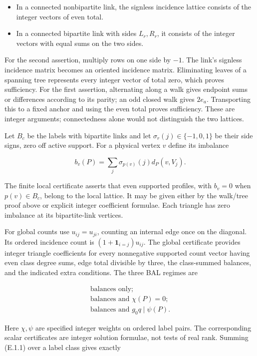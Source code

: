 \documentclass[english,11pt,a4paper]{article}
\providecommand{\tightlist}{\setlength{\itemsep}{0pt}\setlength{\parskip}{0pt}}
\begin{document}
\begin{itemize}
\tightlist
\item
  In a connected nonbipartite link, the signless incidence lattice consists of the integer vectors of even total.
\item
  In a connected bipartite link with sides \(L_r,R_r\), it consists of the integer vectors with equal sums on the two sides.
\end{itemize}

For the second assertion, multiply rows on one side by \(-1\). The link's signless incidence matrix becomes an oriented incidence matrix. Eliminating leaves of a spanning tree represents every integer vector of total zero, which proves sufficiency. For the first assertion, alternating along a walk gives endpoint sums or differences according to its parity; an odd closed walk gives \(2e_a\). Transporting this to a fixed anchor and using the even total proves sufficiency. These are integer arguments; connectedness alone would not distinguish the two lattices.

Let \(B_c\) be the labels with bipartite links and let \(\sigma_r(j)\in\{-1,0,1\}\) be their side signs, zero off active support. For a physical vertex \(v\) define its imbalance

\[b_v(P)=\sum_j\sigma_{p(v)}(j)d_P(v,V_j).
\tag{E.1.1}\]

The finite local certificate asserts that even supported profiles, with \(b_v=0\) when \(p(v)\in B_c\), belong to the local lattice. It may be given either by the walk/tree proof above or explicit integer coefficient formulae. Each triangle has zero imbalance at its bipartite-link vertices.

For global counts use \(u_{ij}=u_{ji}\), counting an internal edge once on the diagonal. Its ordered incidence count is \((1+\mathbf1_{i=j})u_{ij}\). The global certificate provides integer triangle coefficients for every nonnegative supported count vector having even class degree sums, edge total divisible by three, the class-summed balances, and the indicated extra conditions. The three BAL regimes are

\[\begin{gathered}
\text{balances only};\\
\text{balances and }\chi(P)=0;\\
\text{balances and }g_0q\mid\psi(P).
\end{gathered}
\tag{E.1.2}\]

Here \(\chi,\psi\) are specified integer weights on ordered label pairs. The corresponding scalar certificates are integer solution formulae, not tests of real rank. Summing (E.1.1) over a label class gives exactly
\end{document}
